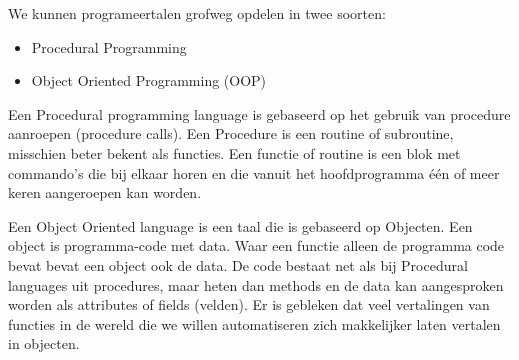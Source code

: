 We kunnen programeertalen grofweg opdelen in twee soorten:
\begin{itemize}
\item Procedural Programming
\item Object Oriented Programming (OOP)
\end{itemize}

Een Procedural programming language is gebaseerd op het gebruik van procedure aanroepen (procedure calls). Een Procedure is een routine of subroutine, misschien beter bekent als functies. Een functie of routine is een blok met commando's die bij elkaar horen en die vanuit het hoofdprogramma \'e\'en of meer keren aangeroepen kan worden.

Een Object Oriented language is een taal die is gebaseerd op Objecten. Een object is programma-code met data. Waar een functie alleen de programma code bevat bevat een object ook de data. De code bestaat net als bij Procedural languages uit procedures, maar heten dan methods en de data kan aangesproken worden als attributes of fields (velden). Er is gebleken dat veel vertalingen van functies in de wereld die we willen automatiseren zich makkelijker laten vertalen in objecten.
